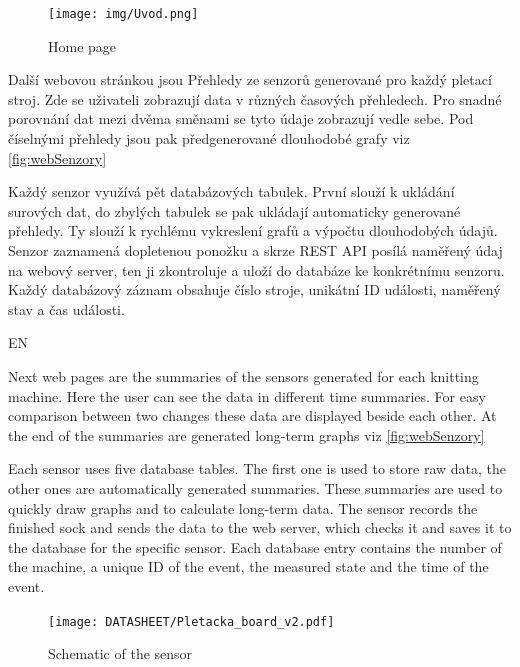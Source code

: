 \documentclass[12pt, a4paper]{article}
\begin{document}
\begin{figure}[t]
    \centering
    \texttt{[image: img/Uvod.png]}
    \caption{Home page}
    \label{fig:webUvod}
\end{figure}

Další webovou stránkou jsou Přehledy ze senzorů generované pro každý pletací stroj.
Zde se uživateli zobrazují data v různých časových přehledech.
Pro snadné porovnání dat mezi dvěma směnami se tyto údaje zobrazují vedle sebe.
Pod číselnými přehledy jsou pak předgenerované dlouhodobé grafy viz \ref{fig:webSenzory}

Každý senzor využívá pět databázových tabulek. První slouží k ukládání surových dat, do zbylých tabulek se pak ukládají automaticky generované přehledy.
Ty slouží k rychlému vykreslení grafů a výpočtu dlouhodobých údajů.
Senzor zaznamená dopletenou ponožku a skrze REST API posílá naměřený údaj na webový server, ten ji zkontroluje a uloží do databáze ke konkrétnímu senzoru.
Každý databázový záznam obsahuje číslo stroje, unikátní ID události, naměřený stav a čas události.

EN

Next web pages are the summaries of the sensors generated for each knitting machine.
Here the user can see the data in different time summaries.
For easy comparison between two changes these data are displayed beside each other.
At the end of the summaries are generated long-term graphs viz \ref{fig:webSenzory}

Each sensor uses five database tables. The first one is used to store raw data, the other ones are automatically generated summaries.
These summaries are used to quickly draw graphs and to calculate long-term data.
The sensor records the finished sock and sends the data to the web server, which checks it and saves it to the database for the specific sensor.
Each database entry contains the number of the machine, a unique ID of the event, the measured state and the time of the event.

% 
\begin{figure}[htbp]
    \centering
    \texttt{[image: DATASHEET/Pletacka\_board\_v2.pdf]}
    \caption{Schematic of the sensor}
    \label{fig:Schemav1}
\end{figure}
\end{document}
